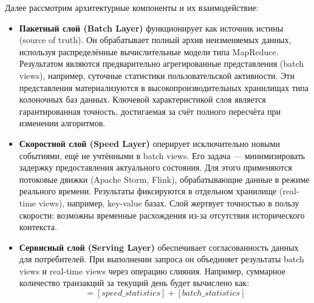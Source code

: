            Далее рассмотрим архитектурные компоненты и их взаимодействие:
            \begin{itemize}
                \item \textbf{Пакетный слой (Batch Layer)} функционирует как источник истины (source of truth). Он обрабатывает полный архив неизменяемых данных, используя распределённые вычислительные модели типа MapReduce. Результатом являются предварительно агрегированные представления (batch views), например, суточные статистики пользовательской активности. Эти представления материализуются в высокопроизводительных хранилищах типа колоночных баз данных. Ключевой характеристикой слоя является гарантированная точность, достигаемая за счёт полного пересчёта при изменении алгоритмов.
                \item \textbf{Скоростной слой (Speed Layer)} оперирует исключительно новыми событиями, ещё не учтёнными в batch views. Его задача — минимизировать задержку предоставления актуального состояния. Для этого применяются потоковые движки (Apache Storm, Flink), обрабатывающие данные в режиме реального времени. Результаты фиксируются в отдельном хранилище (real-time views), например, key-value базах. Слой жертвует точностью в пользу скорости: возможны временные расхождения из-за отсутствия исторического контекста.
                \item \textbf{Сервисный слой (Serving Layer)} обеспечивает согласованность данных для потребителей. При выполнении запроса он объединяет результаты batch views и real-time views через операцию слияния. Например, суммарное количество транзакций за текущий день будет вычислено как: 
                \begin{equation}    
                    [result] = [speed\_statistics] + [batch\_statistics]
                \end{equation}
            \end{itemize}
            
